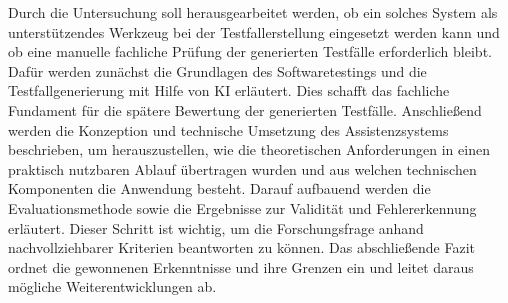 Durch die Untersuchung soll herausgearbeitet werden, ob ein solches System als unterstützendes Werkzeug bei der Testfallerstellung eingesetzt werden kann und ob eine manuelle 
fachliche Prüfung der generierten Testfälle erforderlich bleibt.
\clearpage
Dafür werden zunächst die Grundlagen des Softwaretestings und die Testfallgenerierung mit Hilfe von
\ac{KI} erläutert. Dies schafft das fachliche Fundament für die spätere Bewertung der
generierten Testfälle. Anschließend werden die Konzeption und technische Umsetzung des
Assistenzsystems beschrieben, um herauszustellen, wie die theoretischen Anforderungen in einen
praktisch nutzbaren Ablauf übertragen wurden und aus welchen technischen Komponenten die Anwendung besteht. 
Darauf aufbauend werden die Evaluationsmethode sowie die Ergebnisse zur Validität und Fehlererkennung erläutert. 
Dieser Schritt ist wichtig, um die Forschungsfrage anhand nachvollziehbarer Kriterien beantworten zu können. 
Das abschließende Fazit ordnet die gewonnenen Erkenntnisse und ihre Grenzen ein und leitet daraus
mögliche Weiterentwicklungen ab.

\newpage